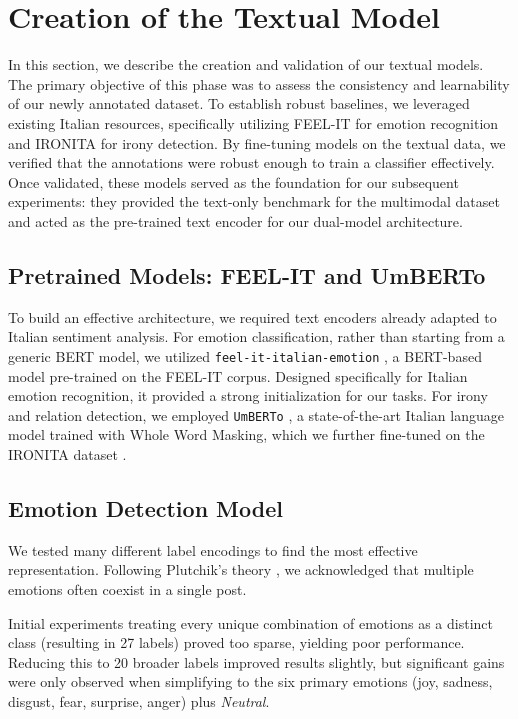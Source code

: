 \documentclass[letterpaper,journal]{IEEEtran}
\begin{document}
\section{Creation of the Textual Model}
In this section, we describe the creation and validation of our textual models. The primary objective of this phase was to assess the consistency and learnability of our newly annotated dataset. To establish robust baselines, we leveraged existing Italian resources, specifically utilizing FEEL-IT \cite{bianchi2021feel} for emotion recognition and IRONITA \cite{ironita2018} for irony detection. By fine-tuning models on the textual data, we verified that the annotations were robust enough to train a classifier effectively. Once validated, these models served as the foundation for our subsequent experiments: they provided the text-only benchmark for the multimodal dataset and acted as the pre-trained text encoder for our dual-model architecture.

\subsection{Pretrained Models: FEEL-IT and UmBERTo}
To build an effective architecture, we required text encoders already adapted to Italian sentiment analysis. For emotion classification, rather than starting from a generic BERT model, we utilized \texttt{feel-it-italian-emotion} \cite{bianchi2021feel}, a BERT-based model pre-trained on the FEEL-IT corpus. Designed specifically for Italian emotion recognition, it provided a strong initialization for our tasks. For irony and relation detection, we employed \texttt{UmBERTo} \cite{musixmatch-2020-umberto}, a state-of-the-art Italian language model trained with Whole Word Masking, which we further fine-tuned on the IRONITA dataset \cite{ironita2018}.

\subsection{Emotion Detection Model}
We tested many different label encodings to find the most effective representation. Following Plutchik’s theory \cite{Plutchik}, we acknowledged that multiple emotions often coexist in a single post.

Initial experiments treating every unique combination of emotions as a distinct class (resulting in 27 labels) proved too sparse, yielding poor performance. Reducing this to 20 broader labels improved results slightly, but significant gains were only observed when simplifying to the six primary emotions (joy, sadness, disgust, fear, surprise, anger) plus \textit{Neutral}.
\end{document}
